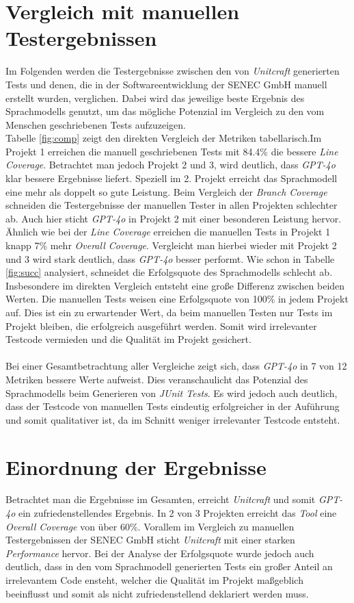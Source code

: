 \section{Vergleich mit manuellen Testergebnissen}
Im Folgenden werden die Testergebnisse zwischen den von \textit{Unitcraft} generierten Tests und denen, die in der Softwareentwicklung der SENEC GmbH manuell erstellt wurden, verglichen. Dabei wird das jeweilige beste Ergebnis des Sprachmodells genutzt, um das mögliche Potenzial im Vergleich zu den vom Menschen geschriebenen Tests aufzuzeigen.\\
Tabelle \ref{fig:comp} zeigt den direkten Vergleich der Metriken tabellarisch.Im Projekt 1 erreichen die manuell geschriebenen Tests mit 84.4\% die bessere \textit{Line Coverage}. Betrachtet man jedoch Projekt 2 und 3, wird deutlich, dass \textit{GPT-4o} klar bessere Ergebnisse liefert. Speziell im 2. Projekt erreicht das Sprachmodell eine mehr als doppelt so gute Leistung. Beim Vergleich der \textit{Branch Coverage} schneiden die Testergebnisse der manuellen Tester in allen Projekten schlechter ab. Auch hier sticht \textit{GPT-4o} in Projekt 2 mit einer besonderen Leistung hervor. Ähnlich wie bei der \textit{Line Coverage} erreichen die manuellen Tests in Projekt 1 knapp 7\% mehr \textit{Overall Coverage}. Vergleicht man hierbei wieder mit Projekt 2 und 3 wird stark deutlich, dass \textit{GPT-4o} besser performt. Wie schon in Tabelle \ref{fig:succ} analysiert, schneidet die Erfolgsquote des Sprachmodells schlecht ab. Insbesondere im direkten Vergleich entsteht eine große Differenz zwischen beiden Werten. Die manuellen Tests weisen eine Erfolgsquote von 100\% in jedem Projekt auf. Dies ist ein zu erwartender Wert, da beim manuellen Testen nur Tests im Projekt bleiben, die erfolgreich ausgeführt werden. Somit wird irrelevanter Testcode vermieden und die Qualität im Projekt gesichert.\\\\
Bei einer Gesamtbetrachtung aller Vergleiche zeigt sich, dass \textit{GPT-4o} in 7 von 12 Metriken bessere Werte aufweist. Dies veranschaulicht das Potenzial des Sprachmodells beim Generieren von \textit{JUnit Tests}. Es wird jedoch auch deutlich, dass der Testcode von manuellen Tests eindeutig erfolgreicher in der Auführung und somit qualitativer ist, da im Schnitt weniger irrelevanter Testcode entsteht.

\section{Einordnung der Ergebnisse}
Betrachtet man die Ergebnisse im Gesamten, erreicht \textit{Unitcraft} und somit \textit{GPT-4o} ein zufriedenstellendes Ergebnis. In 2 von 3 Projekten erreicht das \textit{Tool} eine \textit{Overall Coverage} von über 60\%. Vorallem im Vergleich zu manuellen Testergebnissen der SENEC GmbH sticht \textit{Unitcraft} mit einer starken \textit{Performance} hervor. Bei der Analyse der Erfolgsquote wurde jedoch auch deutlich, dass in den vom Sprachmodell generierten Tests ein großer Anteil an irrelevantem Code ensteht, welcher die Qualität im Projekt maßgeblich beeinflusst und somit als nicht zufriedenstellend deklariert werden muss.

